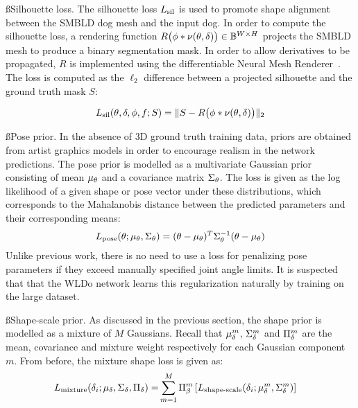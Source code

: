 \ss{Silhouette loss.}
The silhouette loss $L_{\textrm{sil}}$ is used to promote shape alignment between the SMBLD dog mesh and the input dog. In order to compute the silhouette loss, a rendering function $R\bigl(\phi * \nu(\theta, \delta)\bigr) \in \mathbb{B}^{W\times H}$ projects the SMBLD mesh to produce a binary segmentation mask. In order to allow derivatives to be propagated, $R$ is implemented using the differentiable Neural Mesh Renderer~\cite{kato2018renderer}. The loss is computed as the $\ell_2$ difference between a projected silhouette and the ground truth mask $S$:

\begin{equation}
L_{\textrm{sil}}(\theta, \delta, \phi, f; S) = \lVert S - R\bigl(\phi * \nu(\theta, \delta)\bigr) \rVert_{2}
\end{equation}


\ss{Pose prior.}
In the absence of 3D ground truth training data, priors are obtained from artist graphics models in order to encourage realism in the network predictions. The pose prior is modelled as a multivariate Gaussian prior consisting of mean $\mu_{\theta}$ and a covariance matrix $\Sigma_{\theta}$. The loss is given as the log likelihood of a given shape or pose vector under these distributions, which corresponds to the Mahalanobis distance between the predicted parameters and their corresponding means:
\begin{align}
    L_{\textrm{pose}}(\theta; \mu_{\theta}, \Sigma_{\theta}) &= (\theta - \mu_{\theta})^T \Sigma_{\theta}^{-1} (\theta - \mu_{\theta})\\
\end{align}
Unlike previous work, there is no need to use a loss for penalizing pose parameters if they exceed manually specified joint angle limits. It is suspected that that the WLDo network learns this regularization naturally by training on the large dataset.

\ss{Shape-scale prior.}
As discussed in the previous section, the shape prior is modelled as a mixture of $M$ Gaussians. 
Recall that $\mu_{\delta}^{m}$, $\Sigma_{\delta}^{m}$ and $\Pi_{\delta}^{m}$ are the mean, covariance and mixture weight respectively for each Gaussian component 
$m$. From before, the mixture shape loss is given as:
\begin{align}
    L_{\textrm{mixture}}(\delta_{i}; \mu_{\delta}, \Sigma_{\delta}, \Pi_{\delta})
    =&
    \sum_{m=1}^M \Pi_{\beta}^{m} \left[L_{\textrm{shape-scale}}(\delta_{i}; \mu_{\delta}^{m}, \Sigma_{\delta}^{m})\right]
\end{align}
